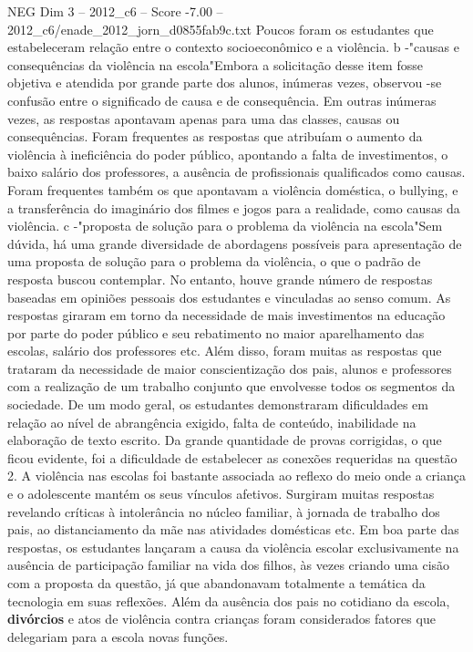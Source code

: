 \begin{textsample}{NEG Dim 3 – 2012\_c6 – Score -7.00 – 2012\_c6/enade\_2012\_jorn\_d0855fab9c.txt}
Poucos foram os estudantes que estabeleceram relação entre o contexto socioeconômico e a violência. b -"causas e consequências da violência na escola"Embora a solicitação desse item fosse objetiva e atendida por grande parte dos alunos, inúmeras vezes, observou -se confusão entre o significado de causa e de consequência.
Em outras inúmeras vezes, as respostas apontavam apenas para uma das classes, causas ou consequências.
Foram frequentes as respostas que atribuíam o aumento da violência à ineficiência do poder público, apontando a falta de investimentos, o baixo salário dos professores, a ausência de profissionais qualificados como causas.
Foram frequentes também os que apontavam a violência doméstica, o bullying, e a transferência do imaginário dos filmes e jogos para a realidade, como causas da violência. c -"proposta de solução para o problema da violência na escola"Sem dúvida, há uma grande diversidade de abordagens possíveis para apresentação de uma proposta de solução para o problema da violência, o que o padrão de resposta buscou contemplar.
No entanto, houve grande número de respostas baseadas em opiniões pessoais dos estudantes e vinculadas ao senso comum.
As respostas giraram em torno da necessidade de mais investimentos na educação por parte do poder público e seu rebatimento no maior aparelhamento das escolas, salário dos professores etc.
Além disso, foram muitas as respostas que trataram da necessidade de maior conscientização dos pais, alunos e professores com a realização de um trabalho conjunto que envolvesse todos os segmentos da sociedade.
De um modo geral, os estudantes demonstraram dificuldades em relação ao nível de abrangência exigido, falta de conteúdo, inabilidade na elaboração de texto escrito.
Da grande quantidade de provas corrigidas, o que ficou evidente, foi a dificuldade de estabelecer as conexões requeridas na questão 2.
A violência nas escolas foi bastante associada ao reflexo do meio onde a criança e o adolescente mantém os seus vínculos afetivos.
Surgiram muitas respostas revelando críticas à intolerância no núcleo familiar, à jornada de trabalho dos pais, ao distanciamento da mãe nas atividades domésticas etc.
Em boa parte das respostas, os estudantes lançaram a causa da violência escolar exclusivamente na ausência de participação familiar na vida dos filhos, às vezes criando uma cisão com a proposta da questão, já que abandonavam totalmente a temática da tecnologia em suas reflexões.
Além da ausência dos pais no cotidiano da escola, \textbf{divórcios} e atos de violência contra crianças foram considerados fatores que delegariam para a escola novas funções.

\end{textsample}
